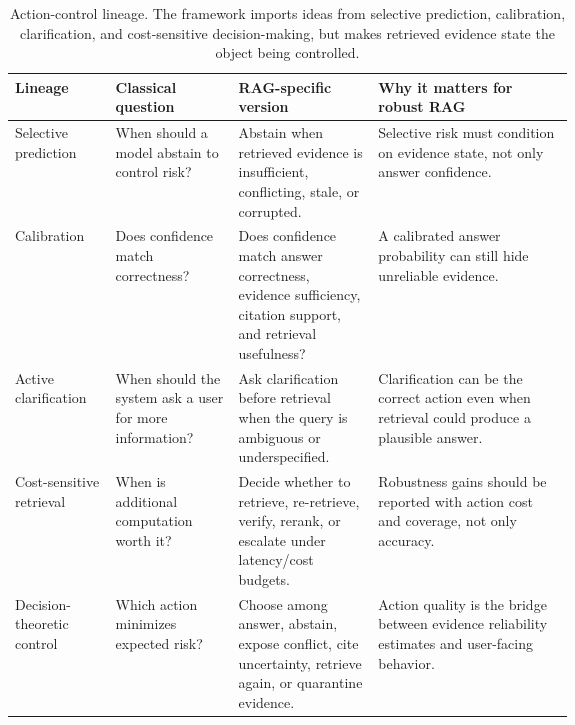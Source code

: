 \begin{table}[t]
\centering
\scriptsize
\renewcommand{\arraystretch}{0.9}
\begin{tabularx}{\linewidth}{>{\raggedright\arraybackslash}p{0.18\linewidth}>{\raggedright\arraybackslash}p{0.22\linewidth}>{\raggedright\arraybackslash}p{0.25\linewidth}X}
\toprule
\textbf{Lineage} & \textbf{Classical question} & \textbf{RAG-specific version} & \textbf{Why it matters for robust RAG} \\
\midrule
Selective prediction & When should a model abstain to control risk? & Abstain when retrieved evidence is insufficient, conflicting, stale, or corrupted. & Selective risk must condition on evidence state, not only answer confidence. \\
Calibration & Does confidence match correctness? & Does confidence match answer correctness, evidence sufficiency, citation support, and retrieval usefulness? & A calibrated answer probability can still hide unreliable evidence. \\
Active clarification & When should the system ask a user for more information? & Ask clarification before retrieval when the query is ambiguous or underspecified. & Clarification can be the correct action even when retrieval could produce a plausible answer. \\
Cost-sensitive retrieval & When is additional computation worth it? & Decide whether to retrieve, re-retrieve, verify, rerank, or escalate under latency/cost budgets. & Robustness gains should be reported with action cost and coverage, not only accuracy. \\
Decision-theoretic control & Which action minimizes expected risk? & Choose among answer, abstain, expose conflict, cite uncertainty, retrieve again, or quarantine evidence. & Action quality is the bridge between evidence reliability estimates and user-facing behavior. \\
\bottomrule
\end{tabularx}
\caption{Action-control lineage. The framework imports ideas from selective prediction, calibration, clarification, and cost-sensitive decision-making, but makes retrieved evidence state the object being controlled.}
\label{tab:action-control-lineage}
\end{table}

